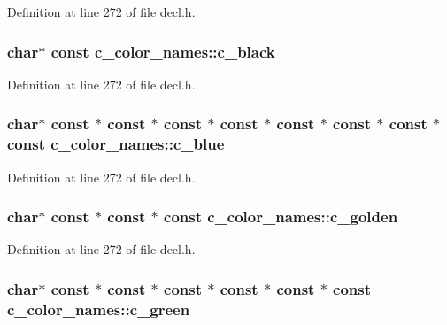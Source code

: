 Definition at line 272 of file decl.\+h.

\hypertarget{structc__color__names_a06bef1382499ad35202ba6ae01f0a2ce}{
\subsubsection[{c\+\_\+black}]{ char$\ast$ {\bf const} c\+\_\+color\+\_\+names\+::c\+\_\+black}}\label{structc__color__names_a06bef1382499ad35202ba6ae01f0a2ce}


Definition at line 272 of file decl.\+h.

\hypertarget{structc__color__names_aa545ae8249cc3d9bde6d6e3bbdede729}{
\subsubsection[{c\+\_\+blue}]{ char$\ast$ {\bf const} $\ast$ {\bf const} $\ast$ {\bf const} $\ast$ {\bf const} $\ast$ {\bf const} $\ast$ {\bf const} $\ast$ {\bf const} $\ast$ {\bf const} c\+\_\+color\+\_\+names\+::c\+\_\+blue}}\label{structc__color__names_aa545ae8249cc3d9bde6d6e3bbdede729}


Definition at line 272 of file decl.\+h.

\hypertarget{structc__color__names_a31cb522727609277dbdf785da0013b22}{
\subsubsection[{c\+\_\+golden}]{ char$\ast$ {\bf const} $\ast$ {\bf const} $\ast$ {\bf const} c\+\_\+color\+\_\+names\+::c\+\_\+golden}}\label{structc__color__names_a31cb522727609277dbdf785da0013b22}


Definition at line 272 of file decl.\+h.

\hypertarget{structc__color__names_adf2704d272ec853501fef64525ee1095}{
\subsubsection[{c\+\_\+green}]{ char$\ast$ {\bf const} $\ast$ {\bf const} $\ast$ {\bf const} $\ast$ {\bf const} $\ast$ {\bf const} $\ast$ {\bf const} c\+\_\+color\+\_\+names\+::c\+\_\+green}}\label{structc__color__names_adf2704d272ec853501fef64525ee1095}


